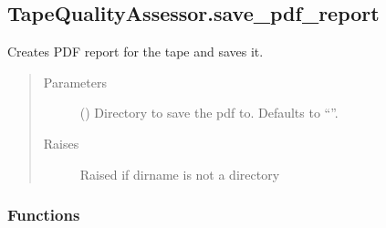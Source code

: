 \documentclass[letterpaper,10pt,english]{sphinxmanual}
\begin{document}
\begin{fulllineitems}
\begin{fulllineitems}
\end{fulllineitems}



\subsection{TapeQualityAssessor.save\_pdf\_report}
\label{\detokenize{generated/quality_assessment.quality_assessor.TapeQualityAssessor.save_pdf_report:tapequalityassessor-save-pdf-report}}\label{\detokenize{generated/quality_assessment.quality_assessor.TapeQualityAssessor.save_pdf_report::doc}}

\begin{fulllineitems}
\label{\detokenize{generated/quality_assessment.quality_assessor.TapeQualityAssessor.save_pdf_report:quality_assessment.quality_assessor.TapeQualityAssessor.save_pdf_report}}
\sphinxAtStartPar
Creates PDF report for the tape and saves it.
\begin{quote}\begin{description}
\item[{Parameters}] \leavevmode
\sphinxAtStartPar
{} (\sphinxstyleliteralemphasis{\sphinxupquote{, }}) \textendash{} Directory to save the pdf to. Defaults to “”.

\item[{Raises}] \leavevmode
\sphinxAtStartPar
{} \textendash{} Raised if dirname is not a directory

\end{description}\end{quote}

\end{fulllineitems}


\end{fulllineitems}

\subsubsection*{Functions}
\end{document}

